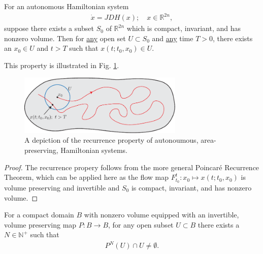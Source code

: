 \begin{proposition}[Recurrence]
	For an autonomous Hamiltonian system
	\begin{align}
		\dot{x}= JDH(x);\quad x \in \mathbb{R}^{2n},
	\end{align}
	suppose there exists a subset $S_0$ of $\mathbb{R}^{2n}$ which is compact, invariant, and has nonzero volume. Then for \underline{any} open set $U\subset S_0$ and \underline{any} time $T>0$, there exists an $x_0 \in U$ and $t>T$ such that $x(t;t_0, x_0)\in U$.	
\end{proposition}
This property is illustrated in Fig. \ref{fig:hamiltonian_recurrence}.
\begin{figure}[h!]
	\centering
	\includegraphics[width=0.7\textwidth]{figures/ch8/11hamiltonian_recurrence.pdf}
	\caption{A depiction of the recurrence property of autonoumous, area-preserving, Hamiltonian systems.}
	\label{fig:hamiltonian_recurrence}
\end{figure}
\begin{proof}
	The recurrence propery follows from the more general Poincaré Recurrence Theorem, which can be applied here as the flow map $F_{t_0}^{t}:x_0 \mapsto x(t;t_0, x_0)$ is volume preserving and invertible and $S_0$ is compact, invariant, and has nonzero volume.
\end{proof}
\begin{proposition}
	For a compact domain $B$ with nonzero volume equipped with an invertible, volume preserving map $P:B\to B$, for any open subset $U\subset B$ there exists a $N \in \mathbb{N}^{+}$ such that
	\begin{align}
		\boxed{P^{N}(U) \cap U \neq \emptyset.}
	\end{align}
\end{proposition}
